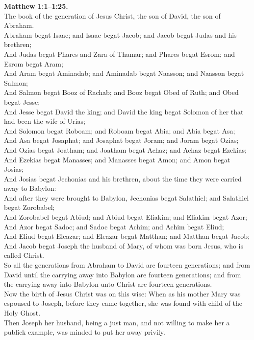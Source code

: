 \documentclass[10pt]{article} %
\begin{document}
{\begin{minipage}[t]{0.45\textwidth}
\textbf{Matthew 1:1--1:25.}\\
The book of the generation of Jesus Christ, the son of David, the son of Abraham.\\
Abraham begat Isaac; and Isaac begat Jacob; and Jacob begat Judas and his brethren;\\
And Judas begat Phares and Zara of Thamar; and Phares begat Esrom; and Esrom begat Aram;\\
And Aram begat Aminadab; and Aminadab begat Naasson; and Naasson begat Salmon;\\
And Salmon begat Booz of Rachab; and Booz begat Obed of Ruth; and Obed begat Jesse;\\
And Jesse begat David the king; and David the king begat Solomon of her that had been the wife of Urias;\\
And Solomon begat Roboam; and Roboam begat Abia; and Abia begat Asa;\\
And Asa begat Josaphat; and Josaphat begat Joram; and Joram begat Ozias;\\
And Ozias begat Joatham; and Joatham begat Achaz; and Achaz begat Ezekias;\\
And Ezekias begat Manasses; and Manasses begat Amon; and Amon begat Josias;\\
And Josias begat Jechonias and his brethren, about the time they were carried away to Babylon:\\
And after they were brought to Babylon, Jechonias begat Salathiel; and Salathiel begat Zorobabel;\\
And Zorobabel begat Abiud; and Abiud begat Eliakim; and Eliakim begat Azor;\\
And Azor begat Sadoc; and Sadoc begat Achim; and Achim begat Eliud;\\
And Eliud begat Eleazar; and Eleazar begat Matthan; and Matthan begat Jacob;\\
And Jacob begat Joseph the husband of Mary, of whom was born Jesus, who is called Christ.\\
So all the generations from Abraham to David are fourteen generations; and from David until the carrying away into Babylon are fourteen generations; and from the carrying away into Babylon unto Christ are fourteen generations.\\
Now the birth of Jesus Christ was on this wise: When as his mother Mary was espoused to Joseph, before they came together, she was found with child of the Holy Ghost.\\
Then Joseph her husband, being a just man, and not willing to make her a publick example, was minded to put her away privily.\\

\end{minipage}}
\end{document}
